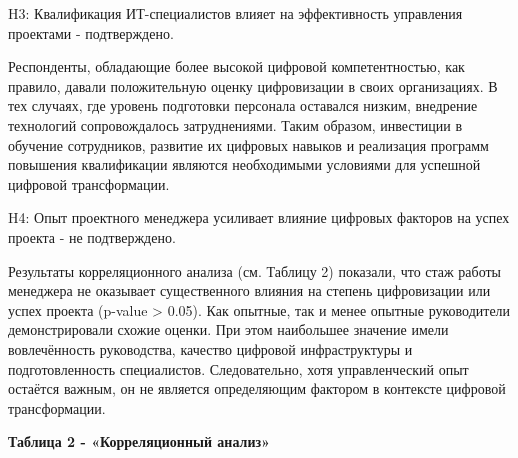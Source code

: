 H3: Квалификация ИТ-специалистов влияет на эффективность управления
проектами - подтверждено.

Респонденты, обладающие более высокой цифровой компетентностью, как
правило, давали положительную оценку цифровизации в своих организациях.
В тех случаях, где уровень подготовки персонала оставался низким,
внедрение технологий сопровождалось затруднениями. Таким образом,
инвестиции в обучение сотрудников, развитие их цифровых навыков и
реализация программ повышения квалификации являются необходимыми
условиями для успешной цифровой трансформации.

H4: Опыт проектного менеджера усиливает влияние цифровых факторов на
успех проекта - не подтверждено.

Результаты корреляционного анализа (см. Таблицу 2) показали, что стаж
работы менеджера не оказывает существенного влияния на степень
цифровизации или успех проекта (p-value \textgreater{} 0.05). Как
опытные, так и менее опытные руководители демонстрировали схожие оценки.
При этом наибольшее значение имели вовлечённость руководства, качество
цифровой инфраструктуры и подготовленность специалистов. Следовательно,
хотя управленческий опыт остаётся важным, он не является определяющим
фактором в контексте цифровой трансформации.

{\bfseries Таблица 2 - «Корреляционный анализ»}


